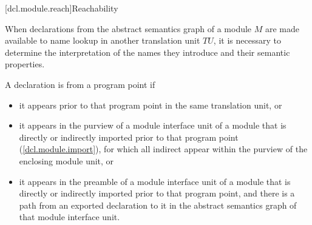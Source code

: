 [dcl.module.reach]{Reachability}

\begin{std.txt}\color{addclr}
  \resetalinea[0]
  \alinea
  When declarations from the abstract semantics graph of a module $M$
   are made available 
  to name lookup in another translation unit $TU$, it is necessary to
  determine the interpretation of the names they introduce and their
  semantic properties.
\begin{after}\color{addclr}
  \alinea
  A declaration is  from a program point if
  \begin{itemize}\color{addclr}
  \item it appears prior to that program point in the same translation unit, or
  \item it appears in the purview of a module interface unit of a module
  that is directly or indirectly imported prior to that program point (\ref{dcl.module.import}),
  for which all indirect  appear within the
  purview of the enclosing module unit, or
  \item it appears in the preamble of a module interface unit of a module
  that is directly
  or indirectly imported prior to that program point,
  and there is a path from an exported declaration to it
  in the abstract semantics graph of that module interface unit.
  \end{itemize}
\end{after}


\end{std.txt}
